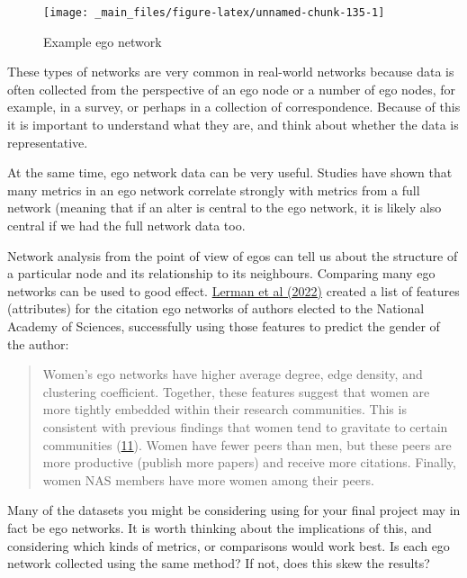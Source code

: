 \documentclass[
]{book}
\begin{document}
\begin{figure}

{\centering \texttt{[image: \_main\_files/figure-latex/unnamed-chunk-135-1]} 

}

\caption{Example ego network}\label{fig:unnamed-chunk-135}
\end{figure}

These types of networks are very common in real-world networks because data is often collected from the perspective of an ego node or a number of ego nodes, for example, in a survey, or perhaps in a collection of correspondence. Because of this it is important to understand what they are, and think about whether the data is representative.

At the same time, ego network data can be very useful. Studies have shown that many metrics in an ego network correlate strongly with metrics from a full network (meaning that if an alter is central to the ego network, it is likely also central if we had the full network data too.

Network analysis from the point of view of egos can tell us about the structure of a particular node and its relationship to its neighbours. Comparing many ego networks can be used to good effect. \href{https://www.pnas.org/doi/10.1073/pnas.2206070119}{Lerman et al (2022)} created a list of features (attributes) for the citation ego networks of authors elected to the National Academy of Sciences, successfully using those features to predict the gender of the author:

\begin{quote}
Women's ego networks have higher average degree, edge density, and clustering coefficient. Together, these features suggest that women are more tightly embedded within their research communities. This is consistent with previous findings that women tend to gravitate to certain communities (\href{https://www.pnas.org/doi/10.1073/pnas.2206070119\#core-r11}{11}). Women have fewer peers than men, but these peers are more productive (publish more papers) and receive more citations. Finally, women NAS members have more women among their peers.
\end{quote}

Many of the datasets you might be considering using for your final project may in fact be ego networks. It is worth thinking about the implications of this, and considering which kinds of metrics, or comparisons would work best. Is each ego network collected using the same method? If not, does this skew the results?
\end{document}

